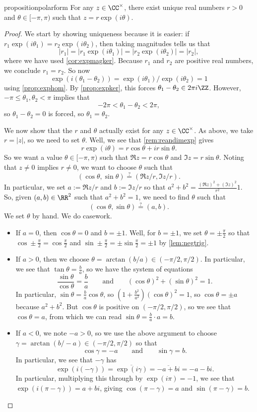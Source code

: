 \begin{restatable}{proposition}{polarform} \label{prop:polarform}
	For any $z\in\CC^\times$, there exist unique real numbers $r>0$ and $\theta\in[-\pi,\pi)$ such that $z=r\exp(i\theta)$.
\end{restatable}
\begin{proof}
	We start by showing uniqueness because it is easier: if $r_1\exp(i\theta_1)=r_2\exp(i\theta_2)$, then taking magnitudes tells us that
	\[|r_1|=|r_1\exp(i\theta_1)|=|r_2\exp(i\theta_2)|=|r_2|,\]
	where we have used \autoref{cor:expmagker}. Because $r_1$ and $r_2$ are positive real numbers, we conclude $r_1=r_2$. So now
	\[\exp(i(\theta_1-\theta_2))=\exp(i\theta_1)/\exp(i\theta_2)=1\]
	using \autoref{prop:exphom}. By \autoref{prop:expker}, this forces $\theta_1-\theta_2\in2\pi i\ZZ$. However, $-\pi\le\theta_1,\theta_2<\pi$ implies that
	\[-2\pi<\theta_1-\theta_2<2\pi,\]
	so $\theta_1-\theta_2=0$ is forced, so $\theta_1=\theta_2$.

	We now show that the $r$ and $\theta$ actually exist for any $z\in\CC^\times$. As above, we take $r=|z|$, so we need to set $\theta$. Well, we see that \autoref{rem:reandimexp} gives
	\[r\exp(i\theta)=r\cos\theta+ir\sin\theta.\]
	So we want a value $\theta\in[-\pi,\pi)$ such that $\Re z=r\cos\theta$ and $\Im z=r\sin\theta$. Noting that $z\ne0$ implies $r\ne0$, we want to choose $\theta$ such that
	\[(\cos\theta,\sin\theta)\stackrel?=(\Re z/r,\Im z/r).\]
	In particular, we set $a:=\Re z/r$ and $b:=\Im z/r$ so that $a^2+b^2=\frac{(\Re z)^2+(\Im z)^2}{r^2}1$. So, given $(a,b)\in\RR^2$ such that $a^2+b^2=1$, we need to find $\theta$ such that
	\[(\cos\theta,\sin\theta)\stackrel?=(a,b).\]
	We set $\theta$ by hand. We do casework.
	\begin{itemize}
		\item If $a=0$, then $\cos\theta=0$ and $b=\pm1$. Well, for $b=\pm1$, we set $\theta=\pm\frac\pi2$ so that $\cos\pm\frac\pi2=\cos\frac\pi2$ and $\sin\pm\frac\pi2=\pm\sin\frac\pi2=\pm1$ by \autoref{lem:negtrig}.
		\item If $a>0$, then we choose $\theta=\arctan(b/a)\in(-\pi/2,\pi/2)$. In particular, we see that $\tan\theta=\frac ba$, so we have the system of equations
		\[\frac{\sin\theta}{\cos\theta}=\frac ba\qquad\text{and}\qquad(\cos\theta)^2+(\sin\theta)^2=1.\]
		In particular, $\sin\theta=\frac ba\cos\theta$, so $\left(1+\frac{b^2}{a^2}\right)(\cos\theta)^2=1$, so $\cos\theta=\pm a$ because $a^2+b^2$. But $\cos\theta$ is positive on $(-\pi/2,\pi/2)$, so we see that $\cos\theta=a$, from which we can read $\sin\theta=\frac ba\cdot a=b$.
		\item If $a<0$, we note $-a>0$, so we use the above argument to choose $\gamma=\arctan(b/-a)\in(-\pi/2,\pi/2)$ so that
		\[\cos\gamma=-a\qquad\text{and}\qquad\sin\gamma=b.\]
		In particular, we see that $-\gamma$ has
		\[\exp(i(-\gamma))=\overline{\exp(i\gamma)}=\overline{-a+bi}=-a-bi.\]
		In particular, multiplying this through by $\exp(i\pi)=-1$, we see that $\exp(i(\pi-\gamma))=a+bi$, giving $\cos(\pi-\gamma)=a$ and $\sin(\pi-\gamma)=b$.


\end{itemize}
\end{proof}
